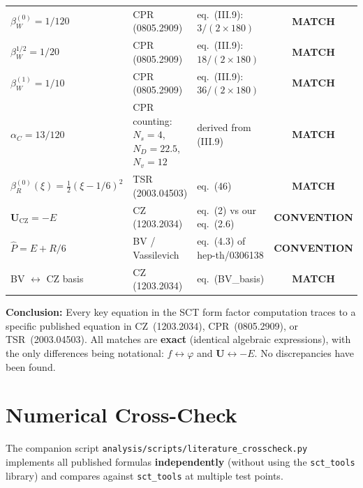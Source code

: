 \documentclass[12pt,a4paper]{article}
\theoremstyle{definition}
\theoremstyle{remark}
\newcommand{\match}{\textcolor{green!60!black}{\textbf{MATCH}}}
\newcommand{\convent}{\textcolor{blue!60!black}{\textbf{CONVENTION}}}
\begin{document}
\begin{center}
\begin{longtable}{p{3.5cm} p{4.5cm} p{3.5cm} c}
$\beta_W^{(0)} = 1/120$
& CPR (0805.2909) & eq.~(III.9): $3/(2\!\times\!180)$ & \match \\[4pt]

$\beta_W^{1/2} = 1/20$
& CPR (0805.2909) & eq.~(III.9): $18/(2\!\times\!180)$ & \match \\[4pt]

$\beta_W^{(1)} = 1/10$
& CPR (0805.2909) & eq.~(III.9): $36/(2\!\times\!180)$ & \match \\[4pt]

$\alpha_C = 13/120$
& CPR counting: $N_s\!=\!4$, $N_D\!=\!22.5$, $N_v\!=\!12$
& derived from (III.9) & \match \\[4pt]

$\beta_R^{(0)}(\xi) = \frac{1}{2}(\xi - 1/6)^2$
& TSR (2003.04503) & eq.~(46) & \match \\[4pt]

$\mathbf{U}_{\text{CZ}} = -E$
& CZ (1203.2034) & eq.~(2) vs our eq.~(2.6) & \convent \\[4pt]

$\hat{P} = E + R/6$
& BV / Vassilevich & eq.~(4.3) of hep-th/0306138 & \convent \\[4pt]

BV $\leftrightarrow$ CZ basis
& CZ (1203.2034) & eq.~(BV\_basis) & \match \\

\bottomrule
\end{longtable}
\end{center}

\medskip\noindent
\textbf{Conclusion:} Every key equation in the SCT form factor computation
traces to a specific published equation in CZ~(1203.2034), CPR~(0805.2909),
or TSR~(2003.04503).  All matches are \textbf{exact} (identical algebraic
expressions), with the only differences being notational:
$f \leftrightarrow \varphi$ and $\mathbf{U} \leftrightarrow -E$.
No discrepancies have been found.


\section{Numerical Cross-Check}
\label{sec:numerical}

The companion script \texttt{analysis/scripts/literature\_crosscheck.py}
implements all published formulas \textbf{independently} (without using
the \texttt{sct\_tools} library) and compares against \texttt{sct\_tools}
at multiple test points.
\end{document}
